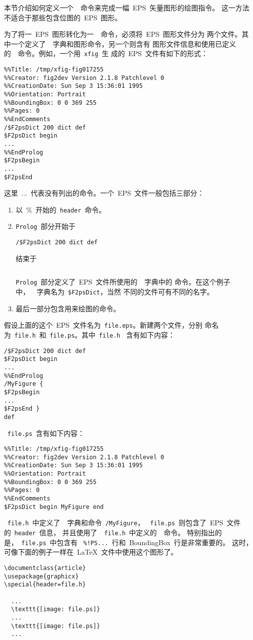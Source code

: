 本节介绍如何定义一个~\PS~命令来完成一幅~EPS~矢量图形的绘图指令。
这一方法不适合于那些包含位图的~EPS~图形。

为了将一~EPS~图形转化为一~\PS~命令，必须将~EPS~图形文件分为
两个文件。其中一个定义了~\PS~字典和图形命令，另一个则含有
图形文件信息和使用已定义的~\PS~命令。例如，一个用~\texttt{xfig}~生
成的~EPS~文件有如下的形式：
\begin{Verbatim}[xleftmargin=1cm]
%!PS-Adobe-2.0 EPSF-2.0
%%Title: /tmp/xfig-fig017255
%%Creator: fig2dev Version 2.1.8 Patchlevel 0
%%CreationDate: Sun Sep 3 15:36:01 1995
%%Orientation: Portrait
%%BoundingBox: 0 0 369 255
%%Pages: 0
%%EndComments
/$F2psDict 200 dict def
$F2psDict begin
...
%%EndProlog
$F2psBegin
...
$F2psEnd
\end{Verbatim}
这里~...~代表没有列出的命令。一个~EPS~文件一般包括三部分：
\begin{enumerate}
\item 以~\%~开始的~\texttt{header}~命令。
\item \texttt{Prolog}~部分开始于
      \begin{Verbatim}[xleftmargin=1cm]
      /$F2psDict 200 dict def
      \end{Verbatim}
      结束于
      \begin{Verbatim}[xleftmargin=1cm]
      %%EndProlog
      \end{Verbatim}
      \texttt{Prolog}~部分定义了~EPS~文件所使用的~\PS~字典中的
      命令。在这个例子中，~\PS~字典名为~\texttt{\$F2psDict}，当然
      不同的文件可有不同的名字。
\item 最后一部分包含用来绘图的命令。
\end{enumerate}

假设上面的这个~EPS~文件名为~\texttt{file.eps}。新建两个文件，分别
命名为~\texttt{file.h}~和~\texttt{file.ps}。其中~\texttt{file.h}~
含有如下内容：
\begin{Verbatim}[xleftmargin=1cm]
/$F2psDict 200 dict def
$F2psDict begin
...
%%EndProlog
/MyFigure {
$F2psBegin
...
$F2psEnd }
def
\end{Verbatim}
~\texttt{file.ps}~含有如下内容：
\begin{Verbatim}[xleftmargin=1cm]
%!PS-Adobe-2.0 EPSF-2.0
%%Title: /tmp/xfig-fig017255
%%Creator: fig2dev Version 2.1.8 Patchlevel 0
%%CreationDate: Sun Sep 3 15:36:01 1995
%%Orientation: Portrait
%%BoundingBox: 0 0 369 255
%%Pages: 0
%%EndComments
$F2psDict begin MyFigure end
\end{Verbatim}

~\texttt{file.h}~中定义了~\PS~字典和命令~\texttt{/MyFigure}，
~\texttt{file.ps}~则包含了~EPS~文件的~\texttt{header}~信息，
并且使用了~~\texttt{file.h}~中定义的~\PS~命令。
特别指出的是，~\texttt{file.ps}~中包含有
~\texttt{\%!PS...}~行和~BoundingBox~行是非常重要的。
这时，可像下面的例子一样在~\LaTeX{}~文件中使用这个图形了。
\begin{Verbatim}[xleftmargin=1cm]
\documentclass{article}
\usepackage{graphicx}
\special{header=file.h}

  ...
  \texttt{[image: file.ps]}
  ...
  \texttt{[image: file.ps]}
  ...

\end{Verbatim}

